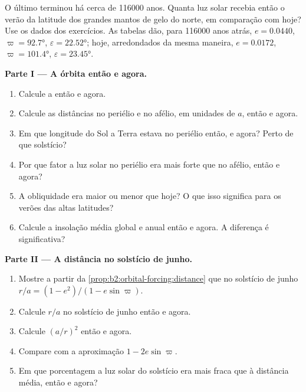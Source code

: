 \begin{problem}\label{pb:b2:orbital-forcing:1}
O último  terminou há cerca de \num{116000} anos. Quanta luz solar recebia então o verão da
latitude dos grandes mantos de gelo do norte, em comparação com hoje? Use os dados dos
exercícios. As tabelas dão, para \num{116000} anos atrás, $e = 0.0440$, $\varpi = \ang{92.7}$,
$\varepsilon = \ang{22.52}$; hoje, arredondados da mesma maneira, $e = 0.0172$, $\varpi = \ang{101.4}$,
$\varepsilon = \ang{23.45}$.

\medskip\noindent\textbf{Parte I --- A órbita então e agora.}
\begin{enumerate}
  \item Calcule a  então e agora.
  \item Calcule as distâncias no periélio e no afélio, em unidades de $a$, então e agora.
  \item Em que longitude do Sol a Terra estava no periélio então, e agora? Perto de que solstício?
  \item Por que fator a luz solar no periélio era mais forte que no afélio, então e agora?
  \item A obliquidade era maior ou menor que hoje? O que isso significa para os verões das
        altas latitudes?
  \item Calcule a insolação média global e anual então e agora. A diferença é significativa?
\end{enumerate}

\medskip\noindent\textbf{Parte II --- A distância no solstício de junho.}
\begin{enumerate}[resume]
  \item Mostre a partir da \cref{prop:b2:orbital-forcing:distance} que no solstício de junho $r/a = (1 -
        e^2)/(1 - e\sin\varpi)$.
  \item Calcule $r/a$ no solstício de junho então e agora.
  \item Calcule $(a/r)^2$ então e agora.
  \item Compare com a aproximação $1 - 2e\sin\varpi$.
  \item Em que porcentagem a luz solar do solstício era mais fraca que à distância média, então e agora?
\end{enumerate}


\end{problem}

